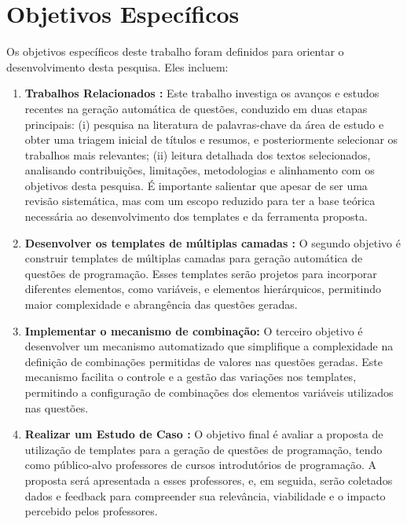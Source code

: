 \section{Objetivos Específicos}

Os objetivos específicos deste trabalho foram definidos para orientar o desenvolvimento desta pesquisa. Eles incluem:

\begin{enumerate}[label=\textbf{\alph*)}]
    \item \textbf{Trabalhos Relacionados :} Este trabalho investiga os avanços e estudos recentes na geração automática de questões, conduzido em duas etapas principais: (i) pesquisa na literatura de palavras-chave da área de estudo e obter uma triagem inicial de títulos e resumos, e posteriormente selecionar os trabalhos mais relevantes; (ii) leitura detalhada dos textos selecionados, analisando contribuições, limitações, metodologias e alinhamento com os objetivos desta pesquisa. É importante salientar que apesar de ser uma revisão sistemática, mas com um escopo reduzido para ter a base teórica necessária ao desenvolvimento dos templates e da ferramenta proposta. 
    \item \textbf{Desenvolver os templates de múltiplas camadas :}  O segundo objetivo é construir templates de múltiplas camadas para geração automática de questões de programação. Esses templates serão projetos para incorporar diferentes elementos, como variáveis, e elementos hierárquicos, permitindo maior complexidade e abrangência das questões geradas. 
    \item \textbf{Implementar o mecanismo de combinação:} O terceiro objetivo é desenvolver um mecanismo automatizado que simplifique a complexidade na definição de combinações permitidas de valores nas questões geradas. Este mecanismo facilita o controle e a gestão das variações nos templates, permitindo a configuração de combinações dos elementos variáveis utilizados nas questões.
    \item \textbf{Realizar um Estudo de Caso :}  
O objetivo final é avaliar a proposta de utilização de templates para a geração de questões de programação, tendo como público-alvo professores de cursos introdutórios de programação. A proposta será apresentada a esses professores, e, em seguida, serão coletados dados e feedback para compreender sua relevância, viabilidade e o impacto percebido pelos professores.

 
\end{enumerate}


